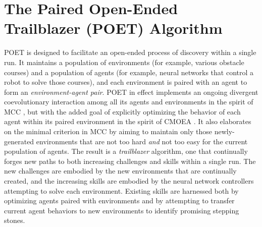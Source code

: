 \documentclass{article}
\newcommand{\jc}[1]{\comments{\textcolor{deepForestGreen}{[JC: #1]}}}
\newcommand{\ks}[1]{\comments{\textcolor{purple}{[Ken: #1]}}}
\newcommand{\comments}[1]{#1}
\begin{document}
\section{The Paired Open-Ended Trailblazer (POET) Algorithm} \label{algos} %
POET is designed to facilitate an open-ended process of discovery within a single run. It maintains a population of environments (for example, various obstacle courses) and a population 
of agents (for example, neural networks that control a robot to solve those courses), and each environment is paired with an agent to form an \textit{environment-agent pair}. POET in effect implements an ongoing divergent coevolutionary interaction 
among all its agents and environments in the spirit of MCC \cite{brant:mcc17}, but with the added goal of explicitly optimizing the behavior of each agent within its paired environment in the spirit of CMOEA \cite{huizinga2016does, Joost:arxiv18}. 
It also elaborates on the minimal criterion in MCC by aiming to maintain only those newly-generated environments that are not too hard \emph{and} not too easy for the current population of agents.
The result is a \emph{trailblazer} algorithm, one that continually forges new paths to both increasing challenges and skills
within a single run.  The new challenges are embodied by the new environments that are continually created, and the increasing skills are embodied by the neural network controllers attempting to solve each environment. Existing skills are harnessed both by optimizing agents paired with environments and by attempting to transfer current agent behaviors to new environments to identify promising stepping stones. 
\end{document}
